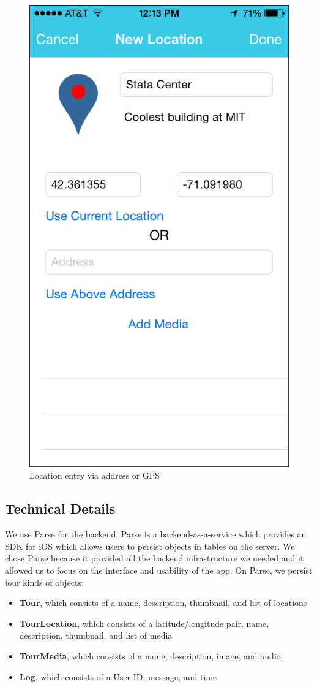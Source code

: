 \documentclass{sigchi}
\begin{document}
\begin{figure}
\centering
\includegraphics[width=0.7\linewidth]{./EnterLocation}
\caption{Location entry via address or GPS} 
\label{fig:EnterLocation}
\end{figure}

\subsection{Technical Details}
We use Parse for the backend. Parse is a backend-as-a-service which provides an SDK for iOS which allows users to persist objects in tables on the server. We chose Parse because it provided all the backend infrastructure we needed and it allowed us to focus on the interface and usability of the app. On Parse, we persist four kinds of objects:

\begin{itemize}
\item \textbf{Tour}, which consists of a name, description, thumbnail, and list of locations
\item \textbf{TourLocation}, which consists of a latitude/longitude pair, name, description, thumbnail, and list of media
\item \textbf{TourMedia}, which consists of a name, description, image, and audio. 
\item \textbf{Log}, which consists of a User ID, message, and time
\end{itemize}
\end{document}
